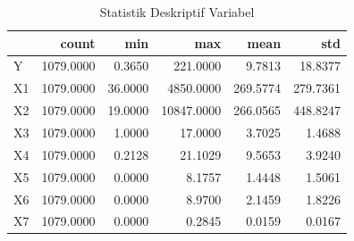 \begin{table}[H]
\centering
\caption{Statistik Deskriptif Variabel}
\label{tab:desc_stats}
\footnotesize
\begin{tabular}{lrrrrr}
\toprule
 & count & min & max & mean & std \\
\midrule
Y & 1079.0000 & 0.3650 & 221.0000 & 9.7813 & 18.8377 \\
X1 & 1079.0000 & 36.0000 & 4850.0000 & 269.5774 & 279.7361 \\
X2 & 1079.0000 & 19.0000 & 10847.0000 & 266.0565 & 448.8247 \\
X3 & 1079.0000 & 1.0000 & 17.0000 & 3.7025 & 1.4688 \\
X4 & 1079.0000 & 0.2128 & 21.1029 & 9.5653 & 3.9240 \\
X5 & 1079.0000 & 0.0000 & 8.1757 & 1.4448 & 1.5061 \\
X6 & 1079.0000 & 0.0000 & 8.9700 & 2.1459 & 1.8226 \\
X7 & 1079.0000 & 0.0000 & 0.2845 & 0.0159 & 0.0167 \\
\bottomrule
\end{tabular}
\end{table}
